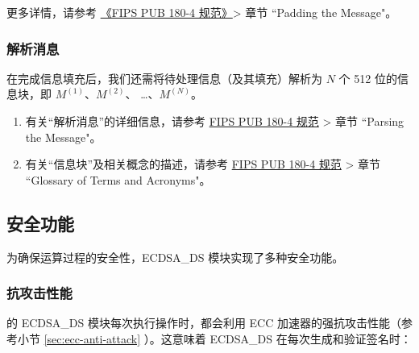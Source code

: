 \documentclass[main\_\_CN.tex]{subfiles}
\begin{document}
更多详情，请参考 \href{https://doi.org/10.6028/NIST.FIPS.180-4}{《FIPS PUB 180-4 规范》}> 章节 ``Padding the Message"。

\subsubsection{解析消息}\label{sec:ecdsa-msg-parsing}

在完成信息填充后，我们还需将待处理信息（及其填充）解析为 \begin{math}N\end{math} 个 512 位的信息块，即 \begin{math}M^{(1)}\end{math}、\begin{math}M^{(2)}\end{math}、 \dots、\begin{math}M^{(N)}\end{math}。

\begin{tiplisting}
\begin{enumerate}
\vspace{-2.5em}
    \item 有关“解析消息”的详细信息，请参考 \href{https://doi.org/10.6028/NIST.FIPS.180-4}{FIPS PUB 180-4 规范} > 章节 ``Parsing the Message"。
    \item 有关“信息块”及相关概念的描述，请参考 \href{https://doi.org/10.6028/NIST.FIPS.180-4}{FIPS PUB 180-4 规范} > 章节 ``Glossary of Terms and Acronyms"。
\end{enumerate}
\end{tiplisting}



\subsection{安全功能}
\label{sec:ecdsa-security_features}

为确保运算过程的安全性，ECDSA\_DS 模块实现了多种安全功能。

\subsubsection{抗攻击性能}

\chipseries{} 的 ECDSA\_DS 模块每次执行操作时，都会利用 ECC 加速器的强抗攻击性能（参考小节 \ref{sec:ecc-anti-attack} \textit{}）。这意味着 ECDSA\_DS 在每次生成和验证签名时：
\end{document}
